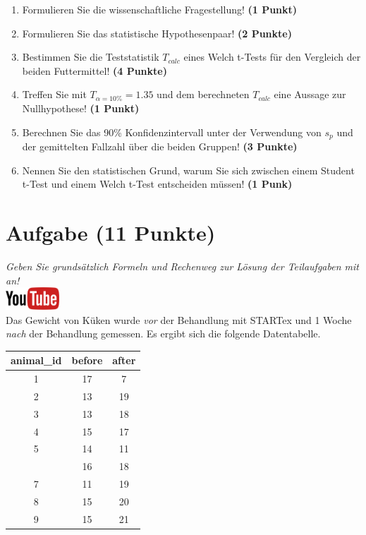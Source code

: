 \documentclass[a4paper, 10pt]{scrartcl}\usepackage[]{graphicx}\usepackage[]{xcolor}
\begin{document}
\begin{enumerate}
  \item Formulieren Sie die wissenschaftliche Fragestellung! \textbf{(1 Punkt)}
  \item Formulieren Sie das statistische Hypothesenpaar! \textbf{(2
      Punkte)}
  \item Bestimmen Sie die Teststatistik $T_{calc}$ eines Welch t-Tests f{\"u}r den
  Vergleich der beiden Futtermittel! \textbf{(4 Punkte)}
\item Treffen Sie mit $T_{\alpha = 10\%} = 1.35$ und dem berechneten $T_{calc}$ eine Aussage
  zur Nullhypothese! \textbf{(1 Punkt)}
\item Berechnen Sie das 90\% Konfidenzintervall unter der
  Verwendung von $s_p$ und der gemittelten Fallzahl {\"u}ber die beiden Gruppen! \textbf{(3 Punkte)}
\item Nennen Sie den statistischen Grund, warum Sie sich zwischen einem Student t-Test und einem
  Welch t-Test entscheiden m{\"u}ssen! \textbf{(1 Punk)}
\end{enumerate} 
\clearpage

\section{Aufgabe \hfill (11 Punkte)}

\textit{Geben Sie grunds{\"a}tzlich Formeln und Rechenweg zur L{\"o}sung der
  Teilaufgaben mit an!} \\[1Ex]

\hfill\href{https://youtu.be/QR90zyn0Iz8}{\includegraphics[width =
  2cm]{img/youtube}}\\[1Ex]


Das Gewicht von K{\"u}ken wurde \textit{vor} der Behandlung mit STARTex und 1
Woche \textit{nach} der Behandlung gemessen. Es ergibt sich die folgende
Datentabelle.

\begin{table}[!h]
\centering
\begin{tabular}{ccc}
\toprule
animal\_id & before & after\\
\midrule
1 & 17 & 7\\
2 & 13 & 19\\
3 & 13 & 18\\
4 & 15 & 17\\
5 & 14 & 11\\
\addlinespace
6 & 16 & 18\\
7 & 11 & 19\\
8 & 15 & 20\\
9 & 15 & 21\\
\bottomrule
\end{tabular}
\end{table}
\end{document}
